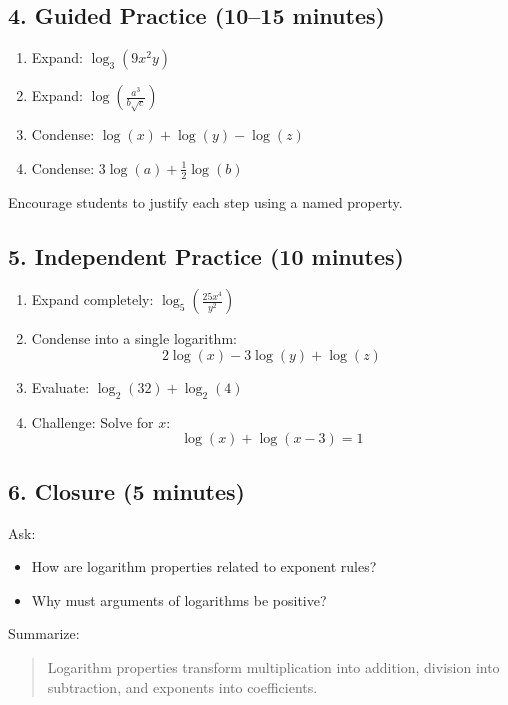 \documentclass[10pt]{article}
\begin{document}
\subsection*{4. Guided Practice (10--15 minutes)}

\begin{enumerate}[label=\arabic*.]
    \item Expand: $\log_3(9x^2y)$
    \item Expand: $\log\left(\frac{a^3}{b\sqrt{c}}\right)$
    \item Condense: $\log(x) + \log(y) - \log(z)$
    \item Condense: $3\log(a) + \frac{1}{2}\log(b)$
\end{enumerate}

Encourage students to justify each step using a named property.

\subsection*{5. Independent Practice (10 minutes)}

\begin{enumerate}[label=\arabic*.]
    \item Expand completely: $\log_5\left(\frac{25x^4}{y^2}\right)$
    \item Condense into a single logarithm: 
    \[
    2\log(x) - 3\log(y) + \log(z)
    \]
    \item Evaluate: $\log_2(32) + \log_2(4)$
    \item Challenge: Solve for $x$:
    \[
    \log(x) + \log(x - 3) = 1
    \]
\end{enumerate}

\subsection*{6. Closure (5 minutes)}

Ask:
\begin{itemize}
    \item How are logarithm properties related to exponent rules?
    \item Why must arguments of logarithms be positive?
\end{itemize}

Summarize:
\begin{quote}
Logarithm properties transform multiplication into addition, division into subtraction, and exponents into coefficients.
\end{quote}
\end{document}
